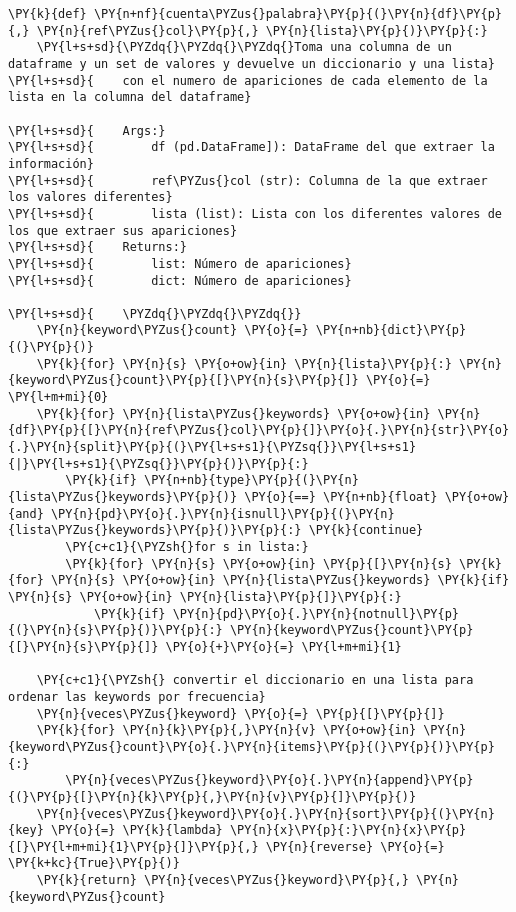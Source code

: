     \begin{tcolorbox}[breakable, size=fbox, boxrule=1pt, pad at break*=1mm,colback=cellbackground, colframe=cellborder]
\begin{Verbatim}[commandchars=\\\{\}]
\PY{k}{def} \PY{n+nf}{cuenta\PYZus{}palabra}\PY{p}{(}\PY{n}{df}\PY{p}{,} \PY{n}{ref\PYZus{}col}\PY{p}{,} \PY{n}{lista}\PY{p}{)}\PY{p}{:}
    \PY{l+s+sd}{\PYZdq{}\PYZdq{}\PYZdq{}Toma una columna de un dataframe y un set de valores y devuelve un diccionario y una lista}
\PY{l+s+sd}{    con el numero de apariciones de cada elemento de la lista en la columna del dataframe}

\PY{l+s+sd}{    Args:}
\PY{l+s+sd}{        df (pd.DataFrame]): DataFrame del que extraer la información}
\PY{l+s+sd}{        ref\PYZus{}col (str): Columna de la que extraer los valores diferentes}
\PY{l+s+sd}{        lista (list): Lista con los diferentes valores de los que extraer sus apariciones}
\PY{l+s+sd}{    Returns:}
\PY{l+s+sd}{        list: Número de apariciones}
\PY{l+s+sd}{        dict: Número de apariciones}

\PY{l+s+sd}{    \PYZdq{}\PYZdq{}\PYZdq{}}
    \PY{n}{keyword\PYZus{}count} \PY{o}{=} \PY{n+nb}{dict}\PY{p}{(}\PY{p}{)}
    \PY{k}{for} \PY{n}{s} \PY{o+ow}{in} \PY{n}{lista}\PY{p}{:} \PY{n}{keyword\PYZus{}count}\PY{p}{[}\PY{n}{s}\PY{p}{]} \PY{o}{=} \PY{l+m+mi}{0}
    \PY{k}{for} \PY{n}{lista\PYZus{}keywords} \PY{o+ow}{in} \PY{n}{df}\PY{p}{[}\PY{n}{ref\PYZus{}col}\PY{p}{]}\PY{o}{.}\PY{n}{str}\PY{o}{.}\PY{n}{split}\PY{p}{(}\PY{l+s+s1}{\PYZsq{}}\PY{l+s+s1}{|}\PY{l+s+s1}{\PYZsq{}}\PY{p}{)}\PY{p}{:}
        \PY{k}{if} \PY{n+nb}{type}\PY{p}{(}\PY{n}{lista\PYZus{}keywords}\PY{p}{)} \PY{o}{==} \PY{n+nb}{float} \PY{o+ow}{and} \PY{n}{pd}\PY{o}{.}\PY{n}{isnull}\PY{p}{(}\PY{n}{lista\PYZus{}keywords}\PY{p}{)}\PY{p}{:} \PY{k}{continue}
        \PY{c+c1}{\PYZsh{}for s in lista:}
        \PY{k}{for} \PY{n}{s} \PY{o+ow}{in} \PY{p}{[}\PY{n}{s} \PY{k}{for} \PY{n}{s} \PY{o+ow}{in} \PY{n}{lista\PYZus{}keywords} \PY{k}{if} \PY{n}{s} \PY{o+ow}{in} \PY{n}{lista}\PY{p}{]}\PY{p}{:}
            \PY{k}{if} \PY{n}{pd}\PY{o}{.}\PY{n}{notnull}\PY{p}{(}\PY{n}{s}\PY{p}{)}\PY{p}{:} \PY{n}{keyword\PYZus{}count}\PY{p}{[}\PY{n}{s}\PY{p}{]} \PY{o}{+}\PY{o}{=} \PY{l+m+mi}{1}
    
    \PY{c+c1}{\PYZsh{} convertir el diccionario en una lista para ordenar las keywords por frecuencia}
    \PY{n}{veces\PYZus{}keyword} \PY{o}{=} \PY{p}{[}\PY{p}{]}
    \PY{k}{for} \PY{n}{k}\PY{p}{,}\PY{n}{v} \PY{o+ow}{in} \PY{n}{keyword\PYZus{}count}\PY{o}{.}\PY{n}{items}\PY{p}{(}\PY{p}{)}\PY{p}{:}
        \PY{n}{veces\PYZus{}keyword}\PY{o}{.}\PY{n}{append}\PY{p}{(}\PY{p}{[}\PY{n}{k}\PY{p}{,}\PY{n}{v}\PY{p}{]}\PY{p}{)}
    \PY{n}{veces\PYZus{}keyword}\PY{o}{.}\PY{n}{sort}\PY{p}{(}\PY{n}{key} \PY{o}{=} \PY{k}{lambda} \PY{n}{x}\PY{p}{:}\PY{n}{x}\PY{p}{[}\PY{l+m+mi}{1}\PY{p}{]}\PY{p}{,} \PY{n}{reverse} \PY{o}{=} \PY{k+kc}{True}\PY{p}{)}
    \PY{k}{return} \PY{n}{veces\PYZus{}keyword}\PY{p}{,} \PY{n}{keyword\PYZus{}count}
\end{Verbatim}
\end{tcolorbox}

